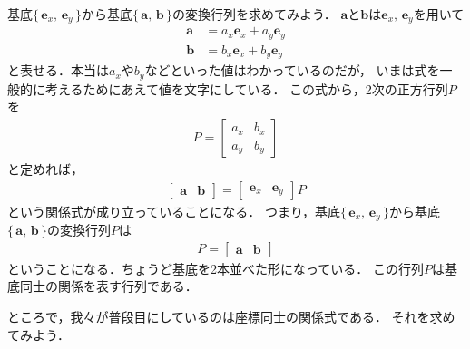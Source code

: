 基底$\{ \, \bm{e}_x, \, \bm{e}_y \, \} $から基底$ \{ \, \bm{a}, \, \bm{b} \, \} $の変換行列を求めてみよう．
$\bm{a}$と$\bm{b}$は$\bm{e}_x, \, \bm{e}_y$を用いて
\begin{align*}
\bm{a} & = a_x \bm{e}_x + a_y \bm{e}_y \\
\bm{b} & = b_x \bm{e}_x + b_y \bm{e}_y
\end{align*}
と表せる．本当は$a_x$や$b_y$などといった値はわかっているのだが，
いまは式を一般的に考えるためにあえて値を文字にしている．
この式から，2次の正方行列$P$を
\begin{align*}
P= 
\left[
\begin{array}{cc}
a_x & b_x \\
a_y & b_y 
\end{array}
\right]
\end{align*}
と定めれば，
\begin{align*}
\left[
\begin{array}{cc}
\bm{a} & \bm{b} 
\end{array}
\right]
=
\left[
\begin{array}{cc}
\bm{e}_x & \bm{e}_y
\end{array}
\right]
P
\end{align*}
という関係式が成り立っていることになる． 
つまり，基底$\{ \, \bm{e}_x, \, \bm{e}_y \, \} $から基底$ \{ \, \bm{a}, \, \bm{b} \, \} $の変換行列$P$は
\begin{align*}
P=
\left[
\begin{array}{cc}
\bm{a} & \bm{b}
\end{array}
\right]
\end{align*}
ということになる．ちょうど基底を2本並べた形になっている．
この行列$P$は基底同士の関係を表す行列である．

ところで，我々が普段目にしているのは座標同士の関係式である．
それを求めてみよう．

